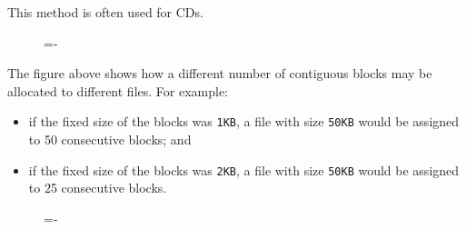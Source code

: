 \documentclass[a4paper]{systems-software}
\begin{document}
This method is often used for CDs.

\begin{figure}[H]
  \lineskip=-\fboxrule
\end{figure}

\newpage

The figure above shows how a different number of contiguous blocks may be allocated to different files. For example:
\begin{itemize}
	\item if the fixed size of the blocks was \texttt{1KB}, a file with size \texttt{50KB} would be assigned to 50 consecutive blocks; and
	\item if the fixed size of the blocks was \texttt{2KB}, a file with size \texttt{50KB} would be assigned to 25 consecutive blocks.
\end{itemize}

\begin{figure}[H]
  \lineskip=-\fboxrule
\end{figure}
\end{document}
